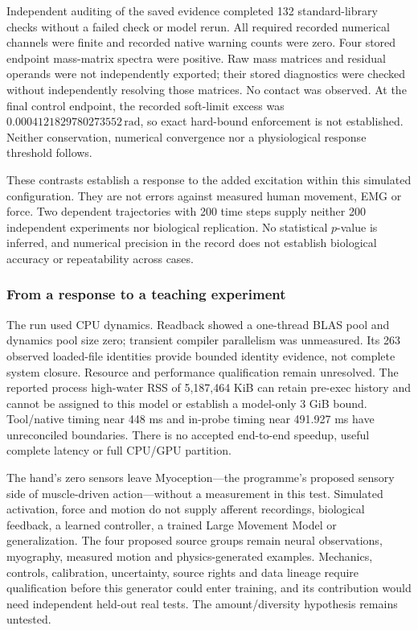 

Independent auditing of the saved evidence completed 132 standard-library checks without a failed check or model rerun. All required recorded numerical channels were finite and recorded native warning counts were zero. Four stored endpoint mass-matrix spectra were positive. Raw mass matrices and residual operands were not independently exported; their stored diagnostics were checked without independently resolving those matrices. No contact was observed. At the final control endpoint, the recorded soft-limit excess was $0.0004121829780273552\,\mathrm{rad}$, so exact hard-bound enforcement is not established. Neither conservation, numerical convergence nor a physiological response threshold follows.

These contrasts establish a response to the added excitation within this simulated configuration. They are not errors against measured human movement, EMG or force. Two dependent trajectories with 200 time steps supply neither 200 independent experiments nor biological replication. No statistical $p$-value is inferred, and numerical precision in the record does not establish biological accuracy or repeatability across cases.

\subsubsection{From a response to a teaching experiment}

The run used CPU dynamics. Readback showed a one-thread BLAS pool and dynamics pool size zero; transient compiler parallelism was unmeasured. Its 263 observed loaded-file identities provide bounded identity evidence, not complete system closure. Resource and performance qualification remain unresolved. The reported process high-water RSS of 5,187,464 KiB can retain pre-exec history and cannot be assigned to this model or establish a model-only 3 GiB bound. Tool/native timing near 448 ms and in-probe timing near 491.927 ms have unreconciled boundaries. There is no accepted end-to-end speedup, useful complete latency or full CPU/GPU partition.

The hand's zero sensors leave Myoception---the programme's proposed sensory side of muscle-driven action---without a measurement in this test. Simulated activation, force and motion do not supply afferent recordings, biological feedback, a learned controller, a trained Large Movement Model or generalization. The four proposed source groups remain neural observations, myography, measured motion and physics-generated examples. Mechanics, controls, calibration, uncertainty, source rights and data lineage require qualification before this generator could enter training, and its contribution would need independent held-out real tests. The amount/diversity hypothesis remains untested.

